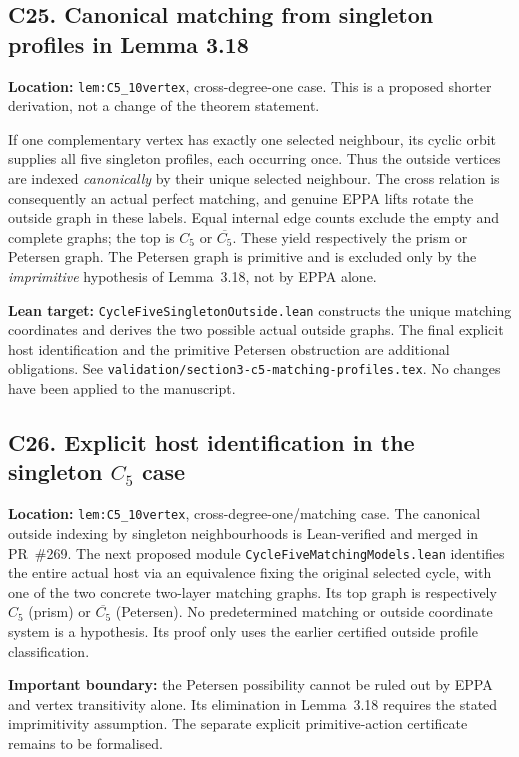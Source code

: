 \documentclass[11pt,a4paper]{article}
\begin{document}
\subsection*{C25. Canonical matching from singleton profiles in Lemma 3.18}
\textbf{Location:} \texttt{lem:C5\_10vertex}, cross-degree-one
case. This is a proposed shorter derivation, not a
change of the theorem statement.

If one complementary vertex has exactly one selected
neighbour, its cyclic orbit supplies all five singleton
profiles, each occurring once. Thus the outside vertices
are indexed \emph{canonically} by their unique selected
neighbour. The cross relation is consequently an actual
perfect matching, and genuine EPPA lifts rotate the
outside graph in these labels. Equal internal edge
counts exclude the empty and complete graphs; the
top is \(C_5\) or \(\overline{C_5}\).
These yield respectively the prism or Petersen graph.
The Petersen graph is primitive and is excluded only
by the \emph{imprimitive} hypothesis of Lemma~3.18,
not by EPPA alone.

\textbf{Lean target:}
\texttt{CycleFiveSingletonOutside.lean} constructs the
unique matching coordinates and derives the two possible
actual outside graphs. The final explicit host
identification and the primitive Petersen obstruction
are additional obligations. See
\texttt{validation/section3-c5-matching-profiles.tex}.
No changes have been applied to the manuscript.

\subsection*{C26. Explicit host identification in the singleton \(C_5\) case}
\textbf{Location:} \texttt{lem:C5\_10vertex},
cross-degree-one/matching case.
The canonical outside indexing by singleton neighbourhoods
is Lean-verified and merged in PR~\#269.
The next proposed module
\texttt{CycleFiveMatchingModels.lean} identifies the entire actual
host via an equivalence fixing the original selected cycle,
with one of the two concrete two-layer matching graphs.
Its top graph is respectively \(C_5\) (prism)
or \(\overline{C_5}\) (Petersen).
No predetermined matching or outside coordinate system
is a hypothesis. Its proof only uses the earlier
certified outside profile classification.

\textbf{Important boundary:} the Petersen possibility
cannot be ruled out by EPPA and vertex transitivity alone.
Its elimination in Lemma~3.18 requires the stated
imprimitivity assumption. The separate explicit
primitive-action certificate remains to be formalised.
\end{document}
